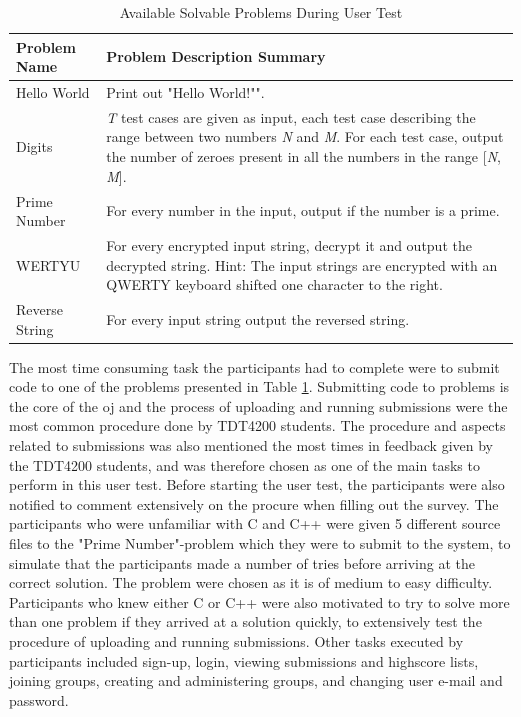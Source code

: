 \begin{table}
    \centering
    \begin{tabular}{ | l | p{6cm} |}
    \hline
    \textbf{Problem Name} & \textbf{Problem Description Summary} \\ \hline
    Hello World & Print out "Hello World!"". \\ \hline
    Digits & \textit{T} test cases are given as input, each test case describing the range between two numbers \textit{N} and \textit{M}. For each test case, output the number of zeroes present in all the numbers in the range [\textit{N}, \textit{M}]. \\ \hline
    Prime Number & For every number in the input, output if the number is a prime. \\ \hline
    WERTYU & For every encrypted input string, decrypt it and output the decrypted string. Hint: The input strings are encrypted with an QWERTY keyboard shifted one character to the right. \\ \hline
    Reverse String & For every input string output the reversed string. \\
    \hline
    \end{tabular}
    \caption{Available Solvable Problems During User Test}
    \label{tab:avail-prob}
\end{table}

The most time consuming task the participants had to complete were to submit code to one of the problems presented in Table \ref{tab:avail-prob}. Submitting code to problems is the core of the \gls{oj} and the process of uploading and running submissions were the most common procedure done by TDT4200 students. The procedure and aspects related to submissions was also mentioned the most times in feedback given by the TDT4200 students, and was therefore chosen as one of the main tasks to perform in this user test. Before starting the user test, the participants were also notified to comment extensively on the procure when filling out the survey. The participants who were unfamiliar with C and C++ were given 5 different source files to the "Prime Number"-problem which they were to submit to the system, to simulate that the participants made a number of tries before arriving at the correct solution. The problem were chosen as it is of medium to easy difficulty. Participants who knew either C or C++ were also motivated to try to solve more than one problem if they arrived at a solution quickly, to extensively test the procedure of uploading and running submissions. Other tasks executed by participants included sign-up, login, viewing submissions and highscore lists, joining groups, creating and administering groups, and changing user e-mail and password. \\

